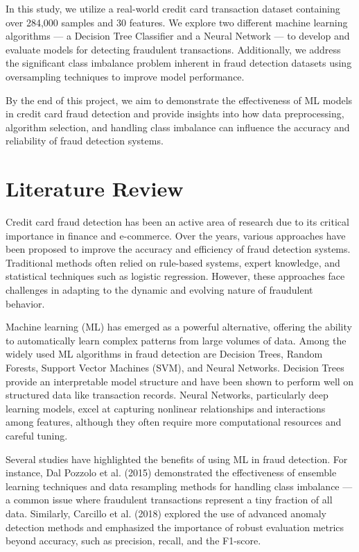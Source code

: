 \documentclass[11pt]{article}
\begin{document}
In this study, we utilize a real-world credit card transaction dataset containing over 284,000 samples and 30 features. We explore two different machine learning algorithms — a Decision Tree Classifier and a Neural Network — to develop and evaluate models for detecting fraudulent transactions. Additionally, we address the significant class imbalance problem inherent in fraud detection datasets using oversampling techniques to improve model performance.

By the end of this project, we aim to demonstrate the effectiveness of ML models in credit card fraud detection and provide insights into how data preprocessing, algorithm selection, and handling class imbalance can influence the accuracy and reliability of fraud detection systems.

\section{Literature Review}
Credit card fraud detection has been an active area of research due to its critical importance in finance and e-commerce. Over the years, various approaches have been proposed to improve the accuracy and efficiency of fraud detection systems. Traditional methods often relied on rule-based systems, expert knowledge, and statistical techniques such as logistic regression. However, these approaches face challenges in adapting to the dynamic and evolving nature of fraudulent behavior.

Machine learning (ML) has emerged as a powerful alternative, offering the ability to automatically learn complex patterns from large volumes of data. Among the widely used ML algorithms in fraud detection are Decision Trees, Random Forests, Support Vector Machines (SVM), and Neural Networks. Decision Trees provide an interpretable model structure and have been shown to perform well on structured data like transaction records. Neural Networks, particularly deep learning models, excel at capturing nonlinear relationships and interactions among features, although they often require more computational resources and careful tuning.

Several studies have highlighted the benefits of using ML in fraud detection. For instance, Dal Pozzolo et al. (2015) demonstrated the effectiveness of ensemble learning techniques and data resampling methods for handling class imbalance — a common issue where fraudulent transactions represent a tiny fraction of all data. Similarly, Carcillo et al. (2018) explored the use of advanced anomaly detection methods and emphasized the importance of robust evaluation metrics beyond accuracy, such as precision, recall, and the F1-score.
\end{document}
